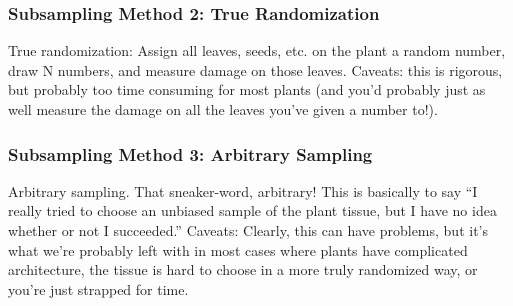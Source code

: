 \documentclass[
  letterpaper,
  DIV=11,
  numbers=noendperiod]{scrreprt}
\begin{document}
\begin{figure}

\begin{minipage}{0.50\linewidth}



\end{minipage}%
%
\begin{minipage}{0.50\linewidth}



\end{minipage}%

\end{figure}%

\subsubsection{Subsampling Method 2: True
Randomization}\label{subsampling-method-2-true-randomization}

True randomization: Assign all leaves, seeds, etc. on the plant a random
number, draw N numbers, and measure damage on those leaves. Caveats:
this is rigorous, but probably too time consuming for most plants (and
you'd probably just as well measure the damage on all the leaves you've
given a number to!).

\subsubsection{Subsampling Method 3: Arbitrary
Sampling}\label{subsampling-method-3-arbitrary-sampling}

Arbitrary sampling. That sneaker-word, arbitrary! This is basically to
say ``I really tried to choose an unbiased sample of the plant tissue,
but I have no idea whether or not I succeeded.'' Caveats: Clearly, this
can have problems, but it's what we're probably left with in most cases
where plants have complicated architecture, the tissue is hard to choose
in a more truly randomized way, or you're just strapped for time.
\end{document}

